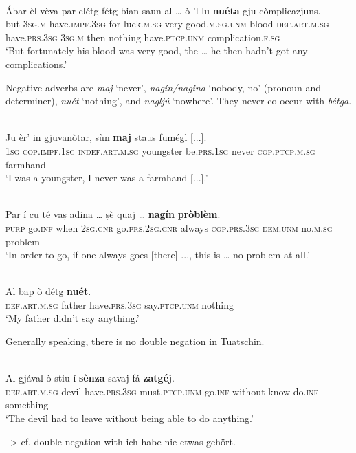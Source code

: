 \ea
\label{}
\\
\gll  Ábar èl vèva par clétg fétg bian saun al … ò 'l lu \textbf{nuéta} gju còmplicazjuns.  \\
but  \textsc{3sg.m} have.\textsc{impf.3sg} for luck.\textsc{m.sg} very good.\textsc{m.sg.unm} blood \textsc{def.art.m.sg} {} have.\textsc{prs.3sg} \textsc{3sg.m} then nothing have.\textsc{ptcp.unm} complication.\textsc{f.sg}\\
\glt `But fortunately his blood was very good, the … he then hadn’t got any complications.'
\z

Negative adverbs are \textit{maj} `never', \textit{nagín/nagina} `nobody, no' (pronoun and determiner), \textit{nuét} `nothing', and \textit{nagljú} `nowhere'. They never co-occur with \textit{bétga}.

\ea
\label{}
\\
\gll Ju èr’ in gjuvanòtar, sùn \textbf{maj} staus fumégl [...].\\
\textsc{1sg} \textsc{cop.impf.1sg} \textsc{indef.art.m.sg} youngster be.\textsc{prs.1sg} never \textsc{cop.ptcp.m.sg} farmhand \\
\glt `I was a youngster, I never was a farmhand [...].'
\z

\ea
\label{}
\\
\gll  Par í cu té vaṣ adina … ṣè quaj … \textbf{nagín} \textbf{pròbl\underline{è}m}.  \\
\textsc{purp} go.\textsc{inf} when \textsc{2sg.gnr} go.\textsc{prs.2sg.gnr} always {} \textsc{cop.prs.3sg} \textsc{dem.unm} {} no.\textsc{m.sg} problem \\
\glt `In order to go, if one always goes [there] ..., this is … no problem at all.'
\z

\ea
\label{}
\\
	\gll Al bap ò détg \textbf{nuét}.\\
\textsc{def.art.m.sg} father have.\textsc{prs.3sg} say.\textsc{ptcp.unm} nothing\\
\glt `My father didn't say anything.'
\z

Generally speaking, there is no double negation in Tuatschin.

\ea
\label{}
 {\citealt[147]{Büchli1966}}\\
\gll    Al gjával ò stiu í \textbf{sènza} savaj fá \textbf{zatgéj}.\\
      \textsc{def.art.m.sg} devil have.\textsc{prs.3sg} must.\textsc{ptcp.unm} go.\textsc{inf} without know do.\textsc{inf} something \\
\glt `The devil had to leave without being able to do anything.'
\z


--> cf. double negation with ich habe nie etwas gehört.



